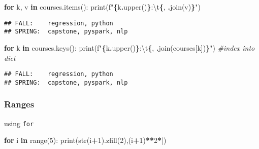 \documentclass[
]{book}
\newenvironment{Shaded}{\begin{snugshade}}{\end{snugshade}}
\newcommand{\BuiltInTok}[1]{#1}
\newcommand{\CharTok}[1]{\textcolor[rgb]{0.31,0.60,0.02}{#1}}
\newcommand{\CommentTok}[1]{\textcolor[rgb]{0.56,0.35,0.01}{\textit{#1}}}
\newcommand{\ControlFlowTok}[1]{\textcolor[rgb]{0.13,0.29,0.53}{\textbf{#1}}}
\newcommand{\DecValTok}[1]{\textcolor[rgb]{0.00,0.00,0.81}{#1}}
\newcommand{\KeywordTok}[1]{\textcolor[rgb]{0.13,0.29,0.53}{\textbf{#1}}}
\newcommand{\NormalTok}[1]{#1}
\newcommand{\OperatorTok}[1]{\textcolor[rgb]{0.81,0.36,0.00}{\textbf{#1}}}
\newcommand{\SpecialCharTok}[1]{\textcolor[rgb]{0.81,0.36,0.00}{\textbf{#1}}}
\newcommand{\SpecialStringTok}[1]{\textcolor[rgb]{0.31,0.60,0.02}{#1}}
\newcommand{\StringTok}[1]{\textcolor[rgb]{0.31,0.60,0.02}{#1}}
\begin{document}
\begin{Shaded}
\begin{Highlighting}[]
\ControlFlowTok{for}\NormalTok{ k, v }\KeywordTok{in}\NormalTok{ courses.items():}
  \BuiltInTok{print}\NormalTok{(}\SpecialStringTok{f"}\SpecialCharTok{\{}\NormalTok{k}\SpecialCharTok{.}\NormalTok{upper()}\SpecialCharTok{\}}\SpecialStringTok{:}\CharTok{\textbackslash{}t}\SpecialCharTok{\{}\StringTok{\textquotesingle{}, \textquotesingle{}}\SpecialCharTok{.}\NormalTok{join(v)}\SpecialCharTok{\}}\SpecialStringTok{"}\NormalTok{)}
\end{Highlighting}
\end{Shaded}

\begin{verbatim}
## FALL:    regression, python
## SPRING:  capstone, pyspark, nlp
\end{verbatim}

\begin{Shaded}
\begin{Highlighting}[]
\ControlFlowTok{for}\NormalTok{ k }\KeywordTok{in}\NormalTok{ courses.keys():}
  \BuiltInTok{print}\NormalTok{(}\SpecialStringTok{f"}\SpecialCharTok{\{}\NormalTok{k}\SpecialCharTok{.}\NormalTok{upper()}\SpecialCharTok{\}}\SpecialStringTok{:}\CharTok{\textbackslash{}t}\SpecialCharTok{\{}\StringTok{\textquotesingle{}, \textquotesingle{}}\SpecialCharTok{.}\NormalTok{join(courses[k])}\SpecialCharTok{\}}\SpecialStringTok{"}\NormalTok{) }\CommentTok{\#index into dict}
\end{Highlighting}
\end{Shaded}

\begin{verbatim}
## FALL:    regression, python
## SPRING:  capstone, pyspark, nlp
\end{verbatim}

\subsubsection{Ranges}\label{ranges}

using \texttt{for}

\begin{Shaded}
\begin{Highlighting}[]
\ControlFlowTok{for}\NormalTok{ i }\KeywordTok{in} \BuiltInTok{range}\NormalTok{(}\DecValTok{5}\NormalTok{):}
  \BuiltInTok{print}\NormalTok{(}\BuiltInTok{str}\NormalTok{(i}\OperatorTok{+}\DecValTok{1}\NormalTok{).zfill(}\DecValTok{2}\NormalTok{),(i}\OperatorTok{+}\DecValTok{1}\NormalTok{)}\OperatorTok{**}\DecValTok{2}\OperatorTok{*}\StringTok{\textquotesingle{}|\textquotesingle{}}\NormalTok{)}
\end{Highlighting}
\end{Shaded}
\end{document}
